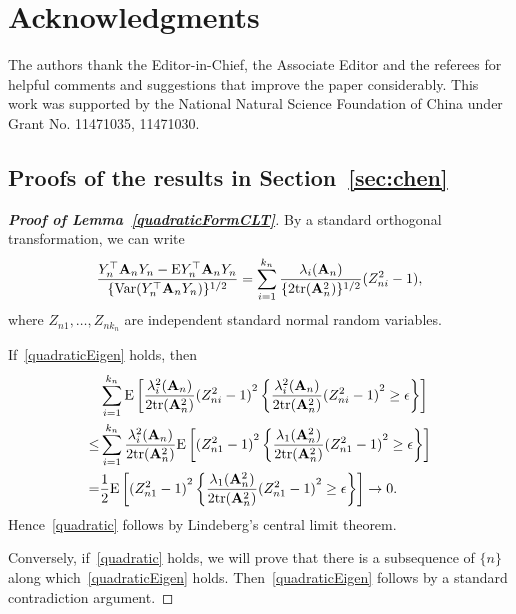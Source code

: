\documentclass[times,sort&compress,3p]{elsarticle}
\newcommand{\mytr}{ {\rm tr} }
\newcommand{\myE}{ {\rm E} }
\newcommand{\myVar}{ {\rm Var} }
\newcommand{\BA}{\mathbf{A}}    \newcommand{\BB}{\mathbf{B}}    \newcommand{\BC}{\mathbf{C}}    \newcommand{\BD}{\mathbf{D}}    \newcommand{\BE}{\mathbf{E}}    \newcommand{\BF}{\mathbf{F}}    \newcommand{\BG}{\mathbf{G}}    \newcommand{\BH}{\mathbf{H}}    \newcommand{\BI}{\mathbf{I}}    \newcommand{\BJ}{\mathbf{J}}    \newcommand{\BK}{\mathbf{K}}    \newcommand{\BL}{\mathbf{L}}
\theoremstyle{plain}
\theoremstyle{definition}
\theoremstyle{remark}
\begin{document}
\section*{Acknowledgments}
The authors thank the Editor-in-Chief, the Associate Editor and the referees for helpful comments and suggestions that improve the paper considerably.
This work was supported by the National Natural Science Foundation of China under Grant No. 11471035, 11471030.
\begin{appendices}
    \section{Proofs of the results in Section~\ref{sec:chen}}\label{appendixA}
\begin{proof}[\textbf{Proof of Lemma~\ref{quadraticFormCLT}}]
    By a standard orthogonal transformation, we can write
    \begin{equation*}
        \frac{Y_n^\top  \BA_n Y_n-\myE Y_n^\top  \BA_n Y_n}{\{\myVar(Y_n^\top  \BA_n Y_n)\}^{1/2}}=\sum_{i=1}^{k_n}\frac{\lambda_i(\BA_n)}{\{2\mytr(\BA_n^2)\}^{1/2}}(Z_{ni}^2-1),
    \end{equation*}
    where $Z_{n1},\ldots,Z_{n k_n}$ are independent standard normal random variables.

    If~\eqref{quadraticEigen} holds, then
        \begin{align*}
            &\sum_{i=1}^{k_n}\myE\left[\frac{\lambda_i^2(\BA_n)}{2\mathrm{tr}(\BA_n^2)}{(Z_{ni}^2-1)}^2\left\{\frac{\lambda_i^2(\BA_n)}{2\mathrm{tr}(\BA_n^2)}{(Z_{ni}^2-1)}^2\geq \epsilon\right\}\right]\\
            \leq&\sum_{i=1}^{k_n}
            \frac{\lambda_i^2(\BA_n)}{2\mytr(\BA_n^2)}
            \myE\left[{(Z_{n1}^2-1)}^2\left\{\frac{\lambda_{1}(\BA_n^2)}{2\mytr(\BA_n^2)}{(Z_{n1}^2-1)}^2\geq \epsilon\right\}\right]\\
            =&
            \frac{1}{2}\myE\left[{(Z_{n1}^2-1)}^2\left\{\frac{\lambda_{1}(\BA_n^2)}{2\mytr(\BA_n^2)}{(Z_{n1}^2-1)}^2\geq \epsilon\right\}\right]\to 0.
        \end{align*}
    Hence~\eqref{quadratic} follows by Lindeberg's central limit theorem.

    Conversely, if~\eqref{quadratic} holds, we will prove that there is a subsequence of $\{n\}$ along which~\eqref{quadraticEigen} holds. Then~\eqref{quadraticEigen} follows by a standard contradiction argument. 


\end{proof}
\end{appendices}
\end{document}
